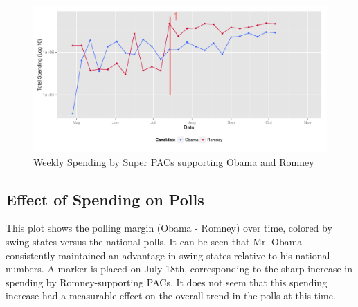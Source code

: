 \documentclass[11pt]{article}\usepackage{graphicx, color}
\newenvironment{knitrout}{}{} %
\begin{document}
\begin{knitrout}
\color{fgcolor}\begin{figure}[H]


{\centering \includegraphics[width=\textwidth]{figure/trend_plot} 

}

\caption[Weekly Spending by Super PACs supporting Obama and Romney]{Weekly Spending by Super PACs supporting Obama and Romney\label{fig:trend_plot}}
\end{figure}

\end{knitrout}


\subsection{Effect of Spending on Polls}

This plot shows the polling margin (Obama - Romney) over time, colored by swing states versus the national polls. It can be seen that Mr. Obama consistently maintained an advantage in swing states relative to his national numbers. A marker is placed on July 18th, corresponding to the sharp increase in spending by Romney-supporting PACs. It does not seem that this spending increase had a measurable effect on the overall trend in the polls at this time.
\end{document}
